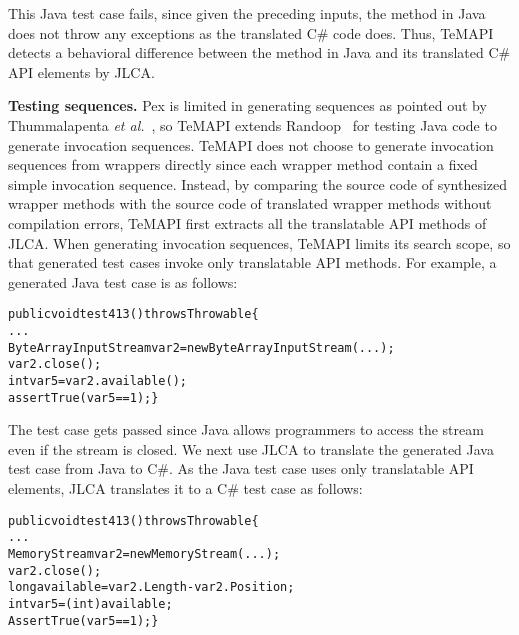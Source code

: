 This Java test case fails, since given the preceding inputs, the  method in Java does not throw any exceptions as the translated C\# code does. Thus, TeMAPI detects a behavioral difference between the  method in Java and its translated C\# API elements by JLCA.

\textbf{Testing sequences.} Pex is limited in generating sequences as pointed out by Thummalapenta \emph{et al.}~\cite{thummalapenta09:mseqgen}, so TeMAPI extends Randoop~\cite{pacheco2007feedback} for testing Java code to generate invocation sequences. TeMAPI does not choose to generate invocation sequences from wrappers directly since each wrapper method contain a fixed simple invocation sequence. Instead, by comparing the source code of synthesized wrapper methods with the source code of translated wrapper methods without compilation errors, TeMAPI first extracts all the translatable API methods of JLCA. When generating invocation sequences, TeMAPI limits its search scope, so that generated test cases invoke only translatable API methods. For example, a generated Java test case is as follows:

\begin{CodeOut}\vspace*{-1ex}
\begin{alltt}
public void test413() throws Throwable\{
  ...
  ByteArrayInputStream var2=new ByteArrayInputStream(...);
  var2.close();
  int var5=var2.available();
  assertTrue(var5 == 1);\}
\end{alltt}
\end{CodeOut}\vspace*{-2ex}


The test case gets passed since Java allows programmers to access the stream even if the stream is closed. We next use JLCA to translate the generated Java test case from Java to C\#. As the Java test case uses only translatable API elements, JLCA translates it to a C\# test case as follows:

\begin{CodeOut}\vspace*{-1ex}
\begin{alltt}
public void test413() throws Throwable\{
  ...
  MemoryStream var2 = new MemoryStream(...);
  var2.close();
  long available = var2.Length - var2.Position;
  int var5 = (int) available;
  AssertTrue(var5 == 1);\}
\end{alltt}
\end{CodeOut}\vspace*{-2ex}

